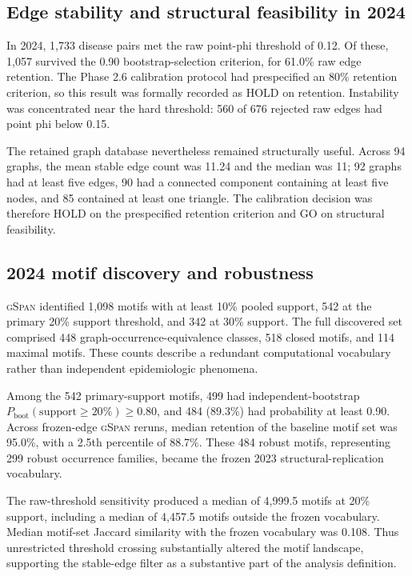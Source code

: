 \documentclass[11pt]{article}
\newcommand{\gspan}{\textsc{gSpan}}
\begin{document}
\subsection{Edge stability and structural feasibility in 2024}

In 2024, 1,733 disease pairs met the raw point-phi threshold of 0.12. Of
these, 1,057 survived the 0.90 bootstrap-selection criterion, for 61.0\% raw
edge retention. The Phase 2.6 calibration protocol had prespecified an 80\%
retention criterion, so this result was formally recorded as
\textsc{HOLD} on retention. Instability was concentrated near the hard
threshold: 560 of 676 rejected raw edges had point phi below 0.15.

The retained graph database nevertheless remained structurally useful. Across
94 graphs, the mean stable edge count was 11.24 and the median was 11;
92 graphs had at least five edges, 90 had a connected component containing at
least five nodes, and 85 contained at least one triangle. The calibration
decision was therefore \textsc{HOLD} on the prespecified retention criterion
and \textsc{GO} on structural feasibility.

\subsection{2024 motif discovery and robustness}

\gspan{} identified 1,098 motifs with at least 10\% pooled support, 542 at the
primary 20\% support threshold, and 342 at 30\% support. The full discovered
set comprised 448 graph-occurrence-equivalence classes, 518 closed motifs,
and 114 maximal motifs. These counts describe a redundant computational
vocabulary rather than independent epidemiologic phenomena.

Among the 542 primary-support motifs, 499 had independent-bootstrap
$P_{\mathrm{boot}}(\mathrm{support}\ge20\%)\ge0.80$, and 484 (89.3\%) had
probability at least 0.90. Across frozen-edge \gspan{} reruns, median retention
of the baseline motif set was 95.0\%, with a 2.5th percentile of 88.7\%.
These 484 robust motifs, representing 299 robust occurrence families, became
the frozen 2023 structural-replication vocabulary.

The raw-threshold sensitivity produced a median of 4,999.5 motifs at 20\%
support, including a median of 4,457.5 motifs outside the frozen vocabulary.
Median motif-set Jaccard similarity with the frozen vocabulary was 0.108.
Thus unrestricted threshold crossing substantially altered the motif
landscape, supporting the stable-edge filter as a substantive part of the
analysis definition.
\end{document}

